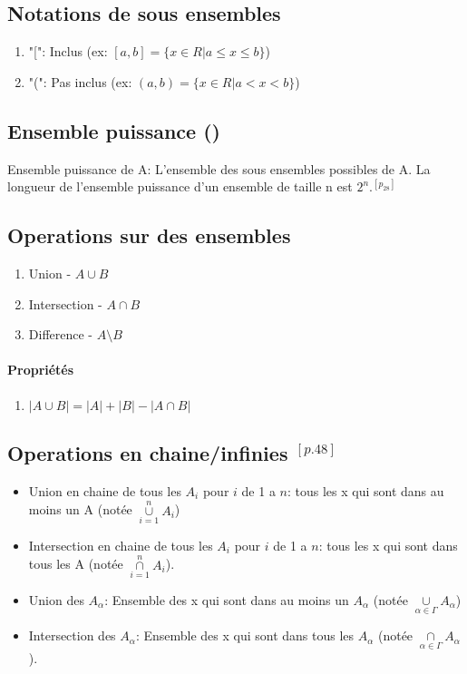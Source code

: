 \documentclass{article}
\begin{document}
  
\subsection{Notations de sous ensembles}
\begin{enumerate}
  \item "[": Inclus (ex: $[a,b] = \{x \in R | a \le x \le b\}$)
  \item "(": Pas inclus (ex: $(a,b) = \{x \in R | a < x < b\}$) 
\end{enumerate}
  
\subsection{Ensemble puissance ()}
Ensemble puissance de A: L'ensemble des sous ensembles possibles de A. La longueur de l'ensemble puissance d'un ensemble de taille n est $2^n$.$^{[p_{28}]}$ 

\subsection{Operations sur des ensembles}
\begin{enumerate}
  \item Union - $ A \cup B$ 
  \item  Intersection - $A \cap B$ 
  \item Difference - $ A \setminus B$
\end{enumerate}

\paragraph{Propriétés}
\begin{enumerate}
\item $|A \cup B| = |A| + |B| - |A \cap B|$
\end{enumerate}

\subsection{Operations en chaine/infinies $^{[p.48]}$}
\begin{itemize}
  \item Union en chaine de tous les $A_i$ pour $i$ de 1 a $n$: tous les x qui sont dans au moins un A (notée $\underset{i=1}{\overset{n}{\cup }} A_i$) 
  \item Intersection en chaine de tous les $A_i$ pour $i$ de 1 a $n$: tous les x qui sont dans tous les A (notée $ \underset{i=1}{\overset{n}{\cap }} A_i$).
  \item  Union des $A_{\alpha}$: Ensemble des x qui sont dans au moins un $A_\alpha$ (notée $\underset{\alpha \in \Gamma}{\overset{}{\cup}} A_\alpha$)
  \item  Intersection des $A_{\alpha}$: Ensemble des x qui sont dans tous les $A_\alpha$ (notée $\underset{\alpha \in \Gamma}{\overset{}{\cap}} A_\alpha$).
\end{itemize}
\end{document}
